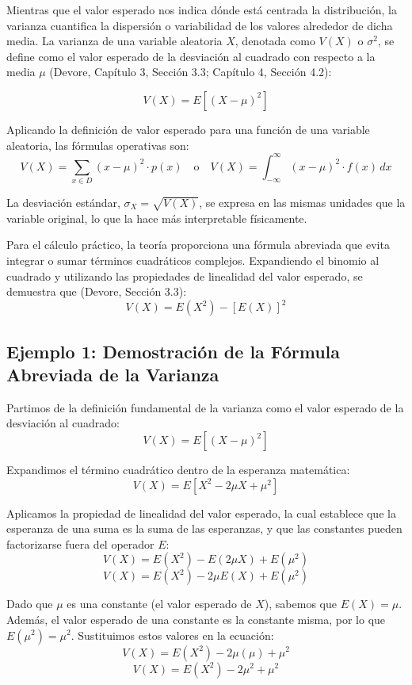 Mientras que el valor esperado nos indica dónde está centrada la distribución, la varianza cuantifica la dispersión o variabilidad de los valores alrededor de dicha media. La varianza de una variable aleatoria $X$, denotada como $V(X)$ o $\sigma^2$, se define como el valor esperado de la desviación al cuadrado con respecto a la media $\mu$ (Devore, Capítulo 3, Sección 3.3; Capítulo 4, Sección 4.2):

$$ V(X) = E[(X - \mu)^2] $$

Aplicando la definición de valor esperado para una función de una variable aleatoria, las fórmulas operativas son:
$$ V(X) = \sum_{x \in D} (x - \mu)^2 \cdot p(x) \quad \text{o} \quad V(X) = \int_{-\infty}^{\infty} (x - \mu)^2 \cdot f(x) \, dx $$

La desviación estándar, $\sigma_X = \sqrt{V(X)}$, se expresa en las mismas unidades que la variable original, lo que la hace más interpretable físicamente. 

Para el cálculo práctico, la teoría proporciona una fórmula abreviada que evita integrar o sumar términos cuadráticos complejos. Expandiendo el binomio al cuadrado y utilizando las propiedades de linealidad del valor esperado, se demuestra que (Devore, Sección 3.3):
$$ V(X) = E(X^2) - [E(X)]^2 $$

\subsection{Ejemplo 1: Demostración de la Fórmula Abreviada de la Varianza}

Partimos de la definición fundamental de la varianza como el valor esperado de la desviación al cuadrado:
$$ V(X) = E[(X - \mu)^2] $$

Expandimos el término cuadrático dentro de la esperanza matemática:
$$ V(X) = E[X^2 - 2\mu X + \mu^2] $$

Aplicamos la propiedad de linealidad del valor esperado, la cual establece que la esperanza de una suma es la suma de las esperanzas, y que las constantes pueden factorizarse fuera del operador $E$:
$$ V(X) = E(X^2) - E(2\mu X) + E(\mu^2) $$
$$ V(X) = E(X^2) - 2\mu E(X) + E(\mu^2) $$

Dado que $\mu$ es una constante (el valor esperado de $X$), sabemos que $E(X) = \mu$. Además, el valor esperado de una constante es la constante misma, por lo que $E(\mu^2) = \mu^2$. Sustituimos estos valores en la ecuación:
$$ V(X) = E(X^2) - 2\mu(\mu) + \mu^2 $$
$$ V(X) = E(X^2) - 2\mu^2 + \mu^2 $$

